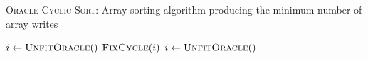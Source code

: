 \begin{algorithm}
\caption{\textsc{Oracle Cyclic Sort}: Array sorting algorithm producing the minimum number of array writes}
\label{alg:ocs_algorithm}      
\begin{algorithmic}[1]
	\State $i \gets \textsc{UnfitOracle}()$
		\State $\textsc{FixCycle}(i)$
		\State $i \gets \textsc{UnfitOracle}()$
	\EndWhile
\EndProcedure
\end{algorithmic}
\end{algorithm}
